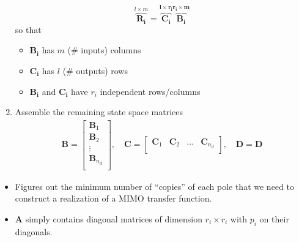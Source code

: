 \begin{enumerate}
          \begin{equation*}
              \overbrace{\mathbf{R_i}}^{l\times m}=\mathbf{\overbrace{\mathbf{C}_i}^{l\times r_i}\overbrace{ \mathbf{B}_i}^{r_i \times m}}
          \end{equation*}
          so that
          \begin{itemize}
              \item $\mathbf{B_i}$ has $m$ (\# inputs) columns
              \item $\mathbf{C_i}$ has $l$ (\# outputs) rows
              \item $\mathbf{B_i}$ and $\mathbf{C_i}$ have $r_i$ independent rows/columns
          \end{itemize}
    \item Assemble the remaining state space matrices
          \begin{gather*}
              \mathbf{B}  =\begin{bmatrix}
                  \mathbf{B}_1     \\
                  \mathbf{B}_2     \\
                  \vdots           \\
                  \mathbf{B}_{n_d} \\
              \end{bmatrix}, \quad
              \mathbf{C}  =\begin{bmatrix}
                  \mathbf{C}_1 & \mathbf{C}_2 & \dots & \mathbf{C}_{n_d} \\
              \end{bmatrix}, \quad
              \mathbf{D} = \mathbf{D}
          \end{gather*}
\end{enumerate}


\begin{itemize}
    \item Figures out the minimum number of ``copies'' of each pole that we need to construct a realization of a MIMO transfer function.
    \item $\mathbf{A}$ simply contains diagonal matrices of dimension $r_i \times r_i$ with $p_i$ on their diagonals.
\end{itemize}

